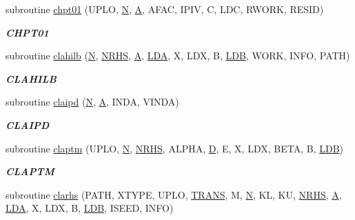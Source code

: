 \begin{DoxyCompactItemize}
subroutine \hyperlink{group__complex__lin_gae63e7c20e520127dbf830972b6ab2262}{chpt01} (U\+P\+L\+O, \hyperlink{polmisc_8c_a0240ac851181b84ac374872dc5434ee4}{N}, \hyperlink{classA}{A}, A\+F\+A\+C, I\+P\+I\+V, C, L\+D\+C, R\+W\+O\+R\+K, R\+E\+S\+I\+D)
\begin{DoxyCompactList}\small\item\em {\bfseries C\+H\+P\+T01} \end{DoxyCompactList}\item 
subroutine \hyperlink{group__complex__lin_gad3cf156a3529004d8ca739e77a1b4e16}{clahilb} (\hyperlink{polmisc_8c_a0240ac851181b84ac374872dc5434ee4}{N}, \hyperlink{example__user_8c_aa0138da002ce2a90360df2f521eb3198}{N\+R\+H\+S}, \hyperlink{classA}{A}, \hyperlink{example__user_8c_ae946da542ce0db94dced19b2ecefd1aa}{L\+D\+A}, X, L\+D\+X, B, \hyperlink{example__user_8c_a50e90a7104df172b5a89a06c47fcca04}{L\+D\+B}, W\+O\+R\+K, I\+N\+F\+O, P\+A\+T\+H)
\begin{DoxyCompactList}\small\item\em {\bfseries C\+L\+A\+H\+I\+L\+B} \end{DoxyCompactList}\item 
subroutine \hyperlink{group__complex__lin_gaba2e103437a13477a0b9a97ac835c138}{claipd} (\hyperlink{polmisc_8c_a0240ac851181b84ac374872dc5434ee4}{N}, \hyperlink{classA}{A}, I\+N\+D\+A, V\+I\+N\+D\+A)
\begin{DoxyCompactList}\small\item\em {\bfseries C\+L\+A\+I\+P\+D} \end{DoxyCompactList}\item 
subroutine \hyperlink{group__complex__lin_ga0a60fb0a8833a1cd76b25d2cab0ab307}{claptm} (U\+P\+L\+O, \hyperlink{polmisc_8c_a0240ac851181b84ac374872dc5434ee4}{N}, \hyperlink{example__user_8c_aa0138da002ce2a90360df2f521eb3198}{N\+R\+H\+S}, A\+L\+P\+H\+A, \hyperlink{odrpack_8h_a7dae6ea403d00f3687f24a874e67d139}{D}, E, X, L\+D\+X, B\+E\+T\+A, B, \hyperlink{example__user_8c_a50e90a7104df172b5a89a06c47fcca04}{L\+D\+B})
\begin{DoxyCompactList}\small\item\em {\bfseries C\+L\+A\+P\+T\+M} \end{DoxyCompactList}\item 
subroutine \hyperlink{group__complex__lin_ga275bf58dfd5af715eea76b14ff5f6023}{clarhs} (P\+A\+T\+H, X\+T\+Y\+P\+E, U\+P\+L\+O, \hyperlink{superlu__enum__consts_8h_a0c4e17b2d5cea33f9991ccc6a6678d62a1f61e3015bfe0f0c2c3fda4c5a0cdf58}{T\+R\+A\+N\+S}, M, \hyperlink{polmisc_8c_a0240ac851181b84ac374872dc5434ee4}{N}, K\+L, K\+U, \hyperlink{example__user_8c_aa0138da002ce2a90360df2f521eb3198}{N\+R\+H\+S}, \hyperlink{classA}{A}, \hyperlink{example__user_8c_ae946da542ce0db94dced19b2ecefd1aa}{L\+D\+A}, X, L\+D\+X, B, \hyperlink{example__user_8c_a50e90a7104df172b5a89a06c47fcca04}{L\+D\+B}, I\+S\+E\+E\+D, I\+N\+F\+O)

\end{DoxyCompactItemize}
